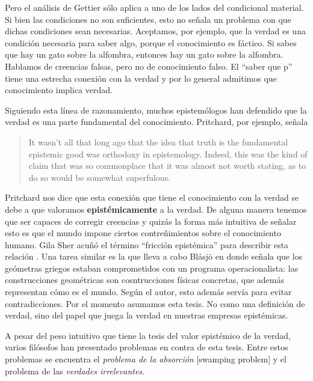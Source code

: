 \documentclass{article}
\begin{document}
Pero el análisis de Gettier sólo aplica a uno de los lados del condicional material. Si bien las condiciones no son suficientes, esto no señala un problema con que dichas condiciones sean necesarias. Aceptamos, por ejemplo, que la verdad es una condición necesaria para saber algo, porque el conocimiento es fáctico. Si sabes que hay un gato sobre la alfombra, entonces hay un gato sobre la alfombra. Hablamos de creencias falsas, pero no de conocimiento falso. El ``saber que p'' tiene una estrecha conexión con la verdad y por lo general admitimos que conocimiento implica verdad.

Siguiendo esta línea de razonamiento, muchos epistemólogos han defendido que la verdad es una parte fundamental del conocimiento. Pritchard, por ejemplo, señala  

\begin{quote}
It wasn’t all that long ago that the idea that truth is the fundamental epistemic good was orthodoxy in epistemology. Indeed, this was the kind of claim that was so commonplace that it was almost not worth stating, as to do so would be somewhat superfulous. \cite[p. 1]{Pritchard2021}
\end{quote}

Pritchard nos dice que esta conexión que tiene el conocimiento con la verdad se debe a que valoramos \textbf{epistémicamente} a la verdad. De alguna manera tenemos que ser capaces de corregir creencias y quizás la forma más intuitiva de señalar esto es que el mundo impone ciertos contreñimientos sobre el conocimiento humano. Gila Sher acuñó el término ``fricción epistémica'' para describir esta relación \citeyear{Sher2016}. Una tarea similar es la que lleva a cabo Blåsjö en \citeyear{Blaasjoe2022} donde señala que los geómetras griegos estaban comprometidos con un programa operacionalista: las construcciones geométricas son cosntrucciones físicas concretas, que además representan cómo es el mundo. Según el autor, esto además servía para evitar contradicciones. Por el momento asumamos esta tesis. No como una definición de verdad, sino del papel que juega la verdad en nuestras empresas epistémicas.

A pesar del peso intuitivo que tiene la tesis del valor epistémico de la verdad, varios filósofos han presentado problemas en contra de esta tesis. Entre estos problemas se encuentra el \textit{problema de la absorción} [swamping problem] y el problema de las \textit{verdades irrelevantes}. 
\end{document}
